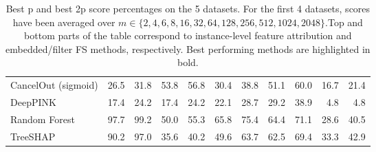\begin{table}[h!]
{{\begin{tabular}{lrrrrrrrrrr}
CancelOut (sigmoid) & 26.5 & 31.8 & 53.8 & 56.8 & 30.4 & 38.8 & 51.1 & 60.0 & 16.7 & 21.4 \\
DeepPINK & 17.4 & 24.2 & 17.4 & 24.2 & 22.1 & 28.7 & 29.2 & 38.9 & 4.8 & 4.8 \\
Random Forest & 97.7 & 99.2 & 50.0 & 55.3 & 65.8 & 75.4 & 64.4 & 71.1 & 28.6 & 40.5 \\
TreeSHAP & 90.2 & 97.0 & 35.6 & 40.2 & 49.6 & 63.7 & 62.5 & 69.4 & 33.3 & 42.9 \\
\bottomrule
\end{tabular}}}{}
\caption{Best p and best 2p score percentages on the 5 datasets. For the first 4 datasets, scores have been averaged over $m \in \{2, 4, 6, 8, 16, 32, 64, 128, 256, 512, 1024, 2048\}$.Top and bottom parts of the table correspond to instance-level feature attribution and embedded/filter FS methods, respectively. Best performing methods are highlighted in bold.}
\end{table}
